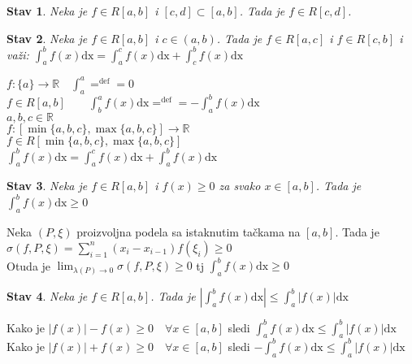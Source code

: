 \documentclass{article}
\newtheorem{stav}{Stav}[section]
\begin{document}
\begin{stavbox}
    \begin{stav}
        Neka je $f\in R[a, b]$ i $[c, d] \subset [a, b]$. Tada je $f\in R[c,d]$.
    \end{stav}
\end{stavbox}
\begin{stavbox}
    \begin{stav}
        Neka je $f \in R[a, b]$ i $c \in (a, b)$. Tada je $f \in R[a, c]$ i $f\in R[c, b]$ i važi: $\displaystyle \int^b_a f(x)\text{dx} = \int^c_a f(x)\text{dx} + \int^b_c f(x)\text{dx}$
    \end{stav}
\end{stavbox}
$f:\{a\} \rightarrow \mathbb{R}\quad\displaystyle\int^a_a =^{\text{def}}= 0$\\
$f \in R[a, b]\quad\displaystyle\quad\int^a_b f(x)\text{dx} =^{\text{def}}= -\int^b_a f(x)\text{dx}$\\
$a, b, c \in \mathbb{R}$\\
$f:[\min\{a, b, c\}, \max\{a, b, c\}] \rightarrow \mathbb{R}$\\
$f\in R[\min\{a, b, c\}, \max\{a, b, c\}]$\\
$\displaystyle \int^b_a f(x)\text{dx} = \int^c_a f(x)\text{dx} + \int^b_a f(x) \text{dx}$
\begin{stavbox}
    \begin{stav}
        Neka je $f \in R[a,b]$ i $f(x) \geq 0$ za svako $x \in [a,b]$. Tada je $\displaystyle \int^b_a f(x)\text{dx} \geq 0$
    \end{stav}
\end{stavbox}
Neka $(P, \xi)$ proizvoljna podela sa istaknutim tačkama na $[a, b]$. Tada je $\sigma(f, P, \xi) = \displaystyle \sum^n_{i=1}(x_i - x_{i-1})f(\xi_i) \geq 0$\\
Otuda je $\displaystyle \lim_{\lambda(P)\rightarrow 0} \sigma (f, P, \xi) \geq 0$ tj $\displaystyle \int^b_a f(x)\text{dx} \geq 0$
\begin{stavbox}
    \begin{stav}
        Neka je $f \in R[a, b]$. Tada je $\displaystyle |\int^b_a f(x)\text{dx}| \leq \int^b_a|f(x)|\text{dx}$
    \end{stav}
\end{stavbox}
Kako je $|f(x)| - f(x) \geq 0 \quad\forall x\in [a, b]$ sledi $\displaystyle \int^b_a f(x)\text{dx} \leq \int^b_a |f(x)|\text{dx}$\\
Kako je $|f(x)| + f(x) \geq 0 \quad\forall x\in [a, b]$ sledi $\displaystyle -\int^b_a f(x)\text{dx} \leq \int^b_a |f(x)|\text{dx}$
\end{document}
